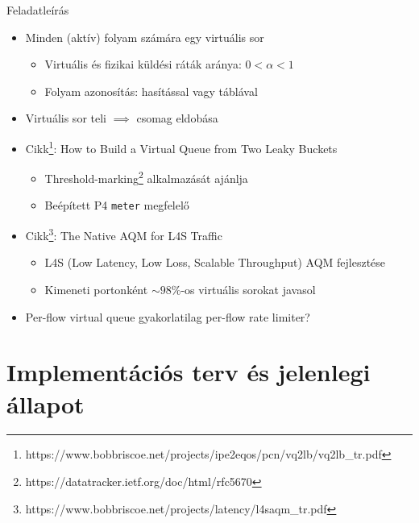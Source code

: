 \documentclass{beamer}
\begin{document}
\begin{frame}{Feladatleírás}
\begin{itemize}
    \item Minden (aktív) folyam számára egy virtuális sor
        \begin{itemize}
            \item Virtuális és fizikai küldési ráták aránya: $0 < \alpha < 1$
            \item Folyam azonosítás: hasítással vagy táblával
        \end{itemize}
    \item Virtuális sor teli $\implies$ csomag eldobása
    \item Cikk\footnote{https://www.bobbriscoe.net/projects/ipe2eqos/pcn/vq2lb/vq2lb\_tr.pdf}: How to Build a Virtual Queue from Two Leaky Buckets
        \begin{itemize}
            \item Threshold-marking\footnote{https://datatracker.ietf.org/doc/html/rfc5670} alkalmazását ajánlja
            \item Beépített P4 \texttt{meter} megfelelő
        \end{itemize}
    \item Cikk\footnote{https://www.bobbriscoe.net/projects/latency/l4saqm\_tr.pdf}: The Native AQM for L4S Traffic
        \begin{itemize}
            \item L4S (Low Latency, Low Loss, Scalable Throughput) AQM fejlesztése
            \item Kimeneti portonként $\sim 98\%$-os virtuális sorokat javasol
        \end{itemize}
    \item Per-flow virtual queue gyakorlatilag per-flow rate limiter?
\end{itemize}
\end{frame}

\section{Implementációs terv és jelenlegi állapot}

\end{document}
